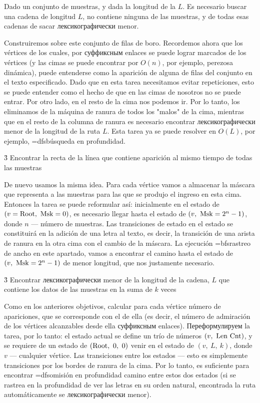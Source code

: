 Dado un conjunto de muestras, y dada la longitud de la $L$. Es necesario buscar una cadena de longitud $L$, no contiene ninguna de las muestras, y de todas esas cadenas de sacar лексикографически menor.

Construiremos sobre este conjunto de filas de boro. Recordemos ahora que los vértices de los cuales, por суффиксным enlaces se puede lograr marcados de los vértices (y las cimas se puede encontrar por $O (n)$, por ejemplo, perezosa dinámica), puede entenderse como la aparición de alguna de filas del conjunto en el texto especificado. Dado que en esta tarea necesitamos evitar repeticiones, esto se puede entender como el hecho de que en las cimas de nosotros no se puede entrar. Por otro lado, en el resto de la cima nos podemos ir. Por lo tanto, los eliminamos de la máquina de ranura de todos los "malos" de la cima, mientras que en el resto de la columna de ranura es necesario encontrar лексикографически menor de la longitud de la ruta $L$. Esta tarea ya se puede resolver en $O (L)$, por ejemplo, \algohref=dfs{búsqueda en profundidad}.


\h3{ Encontrar la recta de la línea que contiene aparición al mismo tiempo de todas las muestras }

De nuevo usamos la misma idea. Para cada vértice vamos a almacenar la máscara que representa a las muestras para las que se produjo el ingreso en esta cima. Entonces la tarea se puede reformular así: inicialmente en el estado de $(v={\rm Root},~{\rm Msk}=0)$, es necesario llegar hasta el estado de $(v,~{\rm Msk}=2^n-1)$, donde $n$ --- número de muestras. Las transiciones de estado en el estado se constituirá en la adición de una letra al texto, es decir, la transición de una arista de ranura en la otra cima con el cambio de la máscara. La ejecución \algohref=bfs{rastreo de ancho} en este apartado, vamos a encontrar el camino hasta el estado de $(v,~{\rm Msk}=2^n-1)$ de menor longitud, que nos justamente necesario.


\h3{ Encontrar лексикографически menor de la longitud de la cadena, $L$ que contiene los datos de las muestras en la suma de $k$ veces }

Como en los anteriores objetivos, calcular para cada vértice número de apariciones, que se corresponde con el de ella (es decir, el número de admiración de los vértices alcanzables desde ella суффиксным enlaces). Переформулируем la tarea, por lo tanto: el estado actual se define un trío de números $(v,~{\rm Len~Cnt})$, y se requiere de un estado de $({\rm Root},~0,~0)$ venir en el estado de $(v,~L,~k)$, donde $v$ --- cualquier vértice. Las transiciones entre los estados --- esto es simplemente transiciones por los bordes de ranura de la cima. Por lo tanto, es suficiente para encontrar \algohref=dfs{omisión en profundidad} camino entre estos dos estados (si se rastrea en la profundidad de ver las letras en su orden natural, encontrada la ruta automáticamente se лексикографически menor).



